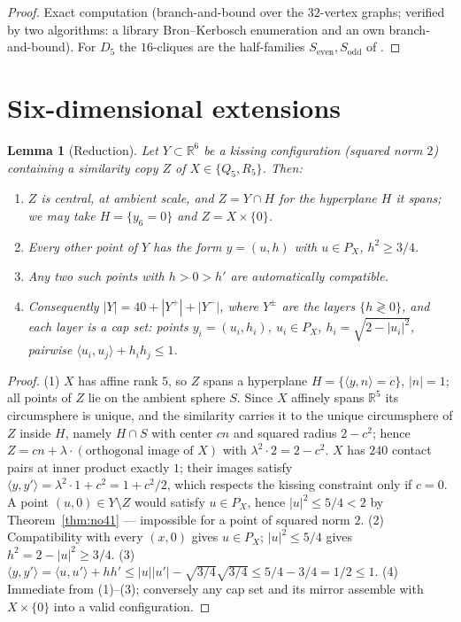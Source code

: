 \documentclass[11pt]{article}
\newtheorem{lemma}[theorem]{Lemma}
\theoremstyle{remark}
\newcommand{\R}{\mathbb{R}}
\newcommand{\ip}[2]{\langle #1,#2\rangle}
\begin{document}
\begin{proof}
Exact computation (branch-and-bound over the $32$-vertex graphs;
verified by two algorithms: a library Bron--Kerbosch enumeration and an
own branch-and-bound). For $D_5$ the $16$-cliques
are the half-families $S_{\mathrm{even}},S_{\mathrm{odd}}$ of
\cite[\S3]{CR2024}.
\end{proof}

\section{Six-dimensional extensions}\label{sec:sixdim}

\begin{lemma}[Reduction]\label{lem:red}
Let $Y\subset\R^6$ be a kissing configuration (squared norm $2$)
containing a similarity copy $Z$ of $X\in\{Q_5,R_5\}$. Then:
\begin{enumerate}
\item $Z$ is central, at ambient scale, and $Z=Y\cap H$ for the
hyperplane $H$ it spans; we may take $H=\{y_6=0\}$ and $Z=X\times\{0\}$.
\item Every other point of $Y$ has the form $y=(u,h)$ with $u\in P_X$,
$h^2\ge 3/4$.
\item Any two such points with $h>0>h'$ are automatically compatible.
\item Consequently $|Y| = 40 + |Y^+| + |Y^-|$, where $Y^{\pm}$ are the
layers $\{h\gtrless 0\}$, and each layer is a \emph{cap set}: points
$y_i=(u_i,h_i)$, $u_i\in P_X$, $h_i=\sqrt{2-|u_i|^2}$, pairwise
$\ip{u_i}{u_j}+h_ih_j\le 1$.
\end{enumerate}
\end{lemma}

\begin{proof}
(1) $X$ has affine rank $5$, so $Z$ spans a hyperplane
$H=\{\ip{y}{n}=c\}$, $|n|=1$; all points of $Z$ lie on the ambient sphere
$S$. Since $X$ affinely spans $\R^5$ its circumsphere is unique, and the
similarity carries it to the unique circumsphere of $Z$ inside $H$, namely
$H\cap S$ with center $cn$ and squared radius $2-c^2$; hence
$Z = cn + \lambda\cdot(\text{orthogonal image of }X)$ with
$\lambda^2\cdot 2 = 2-c^2$. $X$ has $240$ contact pairs at inner
product exactly $1$; their images satisfy
$\ip{y}{y'} = \lambda^2\cdot 1 + c^2 = 1 + c^2/2$, which respects the
kissing constraint only if $c=0$. A point $(u,0)\in Y\setminus Z$ would
satisfy $u\in P_X$, hence $|u|^2\le 5/4<2$ by
Theorem~\ref{thm:no41} --- impossible for a point of squared norm $2$.
(2) Compatibility with every $(x,0)$ gives $u\in P_X$;
$|u|^2\le 5/4$ gives $h^2=2-|u|^2\ge 3/4$.
(3) $\ip{y}{y'}=\ip{u}{u'}+hh' \le |u||u'| - \sqrt{3/4}\sqrt{3/4}
\le 5/4-3/4 = 1/2 \le 1$.
(4) Immediate from (1)--(3); conversely any cap set and its mirror
assemble with $X\times\{0\}$ into a valid configuration.
\end{proof}
\end{document}
